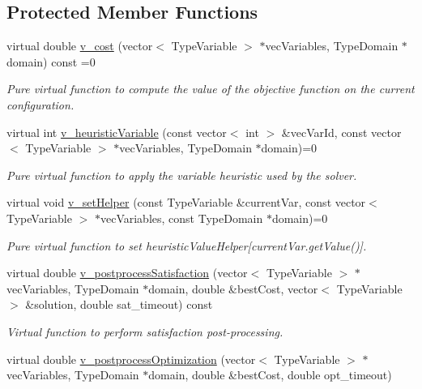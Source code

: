 \subsection*{Protected Member Functions}
\begin{DoxyCompactItemize}
\item 
virtual double \hyperlink{classghost_1_1Objective_a401aa21f01c1e01d34e34893766f3e9d}{v\+\_\+cost} (vector$<$ Type\+Variable $>$ $\ast$vec\+Variables, Type\+Domain $\ast$domain) const =0
\begin{DoxyCompactList}\small\item\em Pure virtual function to compute the value of the objective function on the current configuration. \end{DoxyCompactList}\item 
virtual int \hyperlink{classghost_1_1Objective_ae4a49d23569c367182f934c25a6c6103}{v\+\_\+heuristic\+Variable} (const vector$<$ int $>$ \&vec\+Var\+Id, const vector$<$ Type\+Variable $>$ $\ast$vec\+Variables, Type\+Domain $\ast$domain)=0
\begin{DoxyCompactList}\small\item\em Pure virtual function to apply the variable heuristic used by the solver. \end{DoxyCompactList}\item 
virtual void \hyperlink{classghost_1_1Objective_a8c4efc1602123b28626a37c53e100a6e}{v\+\_\+set\+Helper} (const Type\+Variable \&current\+Var, const vector$<$ Type\+Variable $>$ $\ast$vec\+Variables, const Type\+Domain $\ast$domain)=0
\begin{DoxyCompactList}\small\item\em Pure virtual function to set heuristic\+Value\+Helper\mbox{[}current\+Var.\+get\+Value()\mbox{]}. \end{DoxyCompactList}\item 
virtual double \hyperlink{classghost_1_1Objective_a5f2b324e82efdbdb27528a2915fa14e2}{v\+\_\+postprocess\+Satisfaction} (vector$<$ Type\+Variable $>$ $\ast$vec\+Variables, Type\+Domain $\ast$domain, double \&best\+Cost, vector$<$ Type\+Variable $>$ \&solution, double sat\+\_\+timeout) const 
\begin{DoxyCompactList}\small\item\em Virtual function to perform satisfaction post-\/processing. \end{DoxyCompactList}\item 
virtual double \hyperlink{classghost_1_1Objective_af54dd3c4c9e4115534e25f27b7ccb32f}{v\+\_\+postprocess\+Optimization} (vector$<$ Type\+Variable $>$ $\ast$vec\+Variables, Type\+Domain $\ast$domain, double \&best\+Cost, double opt\+\_\+timeout)

\end{DoxyCompactItemize}
